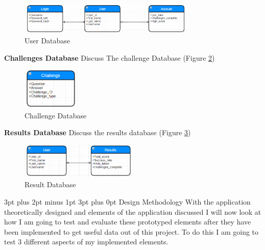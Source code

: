 \documentclass[12pt,a4paper]{article}
\makeatletter
\renewcommand\subsection{\@startsection {subsection}{1}{2mm} %
                               {3pt plus 2pt minus 1pt} %
                               {3pt plus 0pt} %
                               {\normalfont\bfseries}}
\makeatother
\begin{document}
\begin{figure}[h]
    \centering
    \includegraphics[width=0.75\textwidth]{Figs/User_Db.PNG} 
    \caption{User Database} 
    \label{UserDB}
\end{figure}   

\textbf{Challenges Database}   
Discuss The challenge Database (Figure \ref{ChallengeDB})

\begin{figure}[h]
    \centering
    \includegraphics[width=0.25\textwidth]{Figs/Challenge_Db.PNG} 
    \caption{Challenge Database} 
    \label{ChallengeDB}
\end{figure} 

\textbf{Results Database}   
Discuss the results database (Figure \ref{ResultsDB})

\begin{figure}[h]
    \centering
    \includegraphics[width=0.5\textwidth]{Figs/Result_Db.PNG} 
    \caption{Result Database} 
    \label{ResultsDB}
\end{figure} 






\subsection{Design Methodology} 
With the application theoretically designed and elements of the application discussed I will now look at how I am going to test and evaluate these prototyped elements after they have been implemented to get useful data out of this project. To do this I am going to test 3 different aspects of my implemented elements. 
\end{document}
